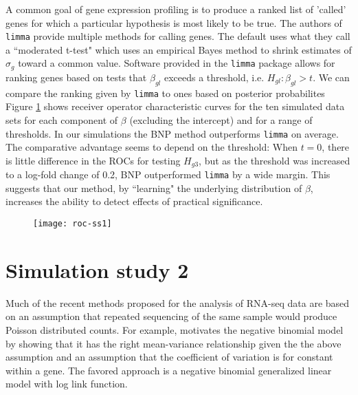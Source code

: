 A common goal of gene expression profiling is to produce a ranked list of 'called' genes for which a particular hypothesis is most likely to be true. The authors of \texttt{limma} provide multiple methods for calling genes. The default uses what they call a ``moderated t-test" which uses an empirical Bayes method to shrink estimates of $\sigma_g$ toward a common value. Software provided in the \texttt{limma} package allows for ranking genes based on tests that $\beta_{gl}$ exceeds a threshold, i.e. $H_{gl}:\beta_{gl}>t$. We can compare the ranking given by \texttt{limma} to ones based on posterior probabilites Figure \ref{roc-ss1} shows receiver operator characteristic curves for the ten simulated data sets for each component of $\beta$ (excluding the intercept) and for a range of thresholds. In our simulations the BNP method outperforms \texttt{limma} on average. The comparative advantage seems to depend on the threshold: When $t=0$, there is little difference in the ROCs for testing $H_{g3}$, but as the threshold was increased to a log-fold change of 0.2, BNP outperformed \texttt{limma} by a wide margin. This suggests that our method, by ``learning" the underlying distribution of $\beta$, increases the ability to detect effects of practical significance.

\begin{figure}[h!]
\texttt{[image: roc-ss1]}
\label{roc-ss1}
\end{figure}

\section{Simulation study 2}
Much of the recent methods proposed for the analysis of RNA-seq data are based on an assumption that repeated sequencing of the same sample would produce Poisson distributed counts. For example, \cite{mccarthy} motivates the negative binomial model by showing that it has the right mean-variance relationship given the the above assumption and an assumption that the coefficient of variation is for constant within a gene. The favored approach is a negative binomial generalized linear model with log link function.

